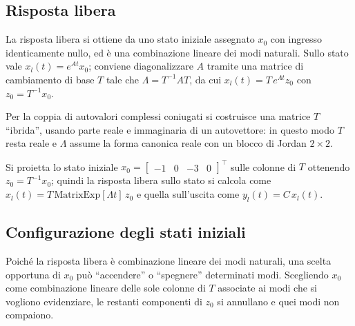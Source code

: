 
\subsection{Risposta libera}
La risposta libera si ottiene da uno stato iniziale assegnato $x_0$ con ingresso
identicamente nullo, ed è una combinazione lineare dei modi naturali. Sullo stato vale
$x_l(t)=e^{At}x_0$; conviene diagonalizzare $A$ tramite una matrice di cambiamento di
base $T$ tale che $\Lambda=T^{-1}AT$, da cui $x_l(t)=T\,e^{\Lambda t}z_0$ con
$z_0=T^{-1}x_0$.

Per la coppia di autovalori complessi coniugati si costruisce una matrice $T$
``ibrida'', usando parte reale e immaginaria di un autovettore: in questo modo $T$
resta reale e $\Lambda$ assume la forma canonica reale con un blocco di Jordan
$2\times2$.


Si proietta lo stato iniziale $x_0=\begin{bmatrix}-1&0&-3&0\end{bmatrix}^{\!\top}$ sulle
colonne di $T$ ottenendo $z_0=T^{-1}x_0$; quindi la risposta libera sullo stato si
calcola come $x_l(t)=T\,\mathrm{MatrixExp}[\Lambda t]\,z_0$ e quella sull'uscita come
$y_l(t)=C\,x_l(t)$.


\subsection{Configurazione degli stati iniziali}
Poiché la risposta libera è combinazione lineare dei modi naturali, una scelta
opportuna di $x_0$ può ``accendere'' o ``spegnere'' determinati modi. Scegliendo $x_0$
come combinazione lineare delle sole colonne di $T$ associate ai modi che si vogliono
evidenziare, le restanti componenti di $z_0$ si annullano e quei modi non compaiono.



